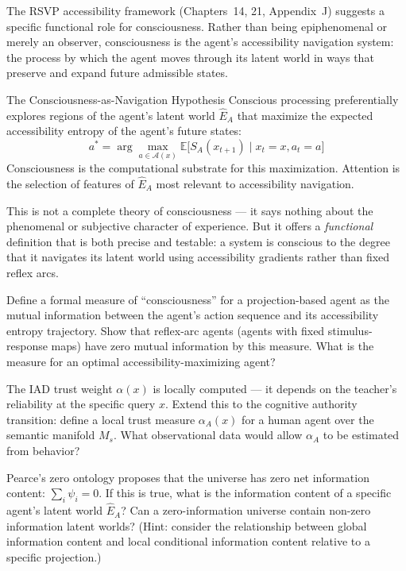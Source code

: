 The RSVP accessibility framework (Chapters~14, 21, Appendix~J) suggests
a specific functional role for consciousness. Rather than being epiphenomenal
or merely an observer, consciousness is the agent's accessibility navigation
system: the process by which the agent moves through its latent world in
ways that preserve and expand future admissible states.

\begin{namedthm}{The Consciousness-as-Navigation Hypothesis}
  Conscious processing preferentially explores regions of the agent's
  latent world $\hat{E}_A$ that maximize the expected accessibility
  entropy of the agent's future states:
  \[
    a^* = \arg\max_{a \in \mathcal{A}(x)} \mathbb{E}\bigl[S_A(x_{t+1})
    \mid x_t = x, a_t = a\bigr]
  \]
  Consciousness is the computational substrate for this maximization.
  Attention is the selection of features of $\hat{E}_A$ most relevant
  to accessibility navigation.
\end{namedthm}

This is not a complete theory of consciousness — it says nothing about
the phenomenal or subjective character of experience. But it offers a
\emph{functional} definition that is both precise and testable: a system
is conscious to the degree that it navigates its latent world using
accessibility gradients rather than fixed reflex arcs.

\begin{exercise}
  Define a formal measure of ``consciousness'' for a projection-based
  agent as the mutual information between the agent's action sequence
  and its accessibility entropy trajectory. Show that reflex-arc agents
  (agents with fixed stimulus-response maps) have zero mutual information
  by this measure. What is the measure for an optimal accessibility-maximizing
  agent?
\end{exercise}

\begin{exercise}
  The IAD trust weight $\alpha(x)$ is locally computed — it depends on
  the teacher's reliability at the specific query $x$. Extend this to
  the cognitive authority transition: define a local trust measure
  $\alpha_A(x)$ for a human agent over the semantic manifold $M_s$.
  What observational data would allow $\alpha_A$ to be estimated from
  behavior?
\end{exercise}

\begin{exercise}[title={Open problem}]
  Pearce's zero ontology proposes that the universe has zero net
  information content: $\sum_i \psi_i = 0$. If this is true, what
  is the information content of a specific agent's latent world
  $\hat{E}_A$? Can a zero-information universe contain non-zero
  information latent worlds? (Hint: consider the relationship between
  global information content and local conditional information content
  relative to a specific projection.)
\end{exercise}
